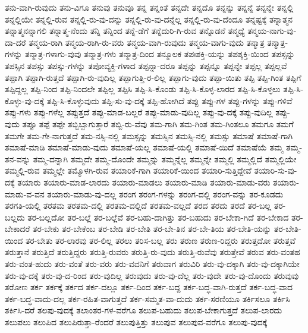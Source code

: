 {ತನು-ವಾಗಿ-ರುವುದು
ತನು-ವಿಗೂ
ತನುವು
ತನುವೂ
ತನ್ನ
ತನ್ನಂತೆ
ತನ್ನದೇ
ತನ್ನದೊ
ತನ್ನನ್ನು
ತನ್ನನ್ನೆ
ತನ್ನನ್ನೇ
ತನ್ನಲ್ಲಿ
ತನ್ನಲ್ಲಿಯೇ
ತನ್ನಲ್ಲಿ-ರುವ
ತನ್ನಲ್ಲಿ-ರು-ವು-ದನ್ನು
ತನ್ನಲ್ಲಿ-ರು-ವು-ದನ್ನೆಲ್ಲ
ತನ್ನಲ್ಲಿ-ರು-ವು-ದೆಂದೂ
ತನ್ನಷ್ಟಕ್ಕೆ
ತನ್ನಾತ್ಮನ
ತನ್ನಾತ್ಮನನ್ನಾಗಲಿ
ತನ್ನಾತ್ಮ-ನೆಂದು
ತನ್ನಿ
ತನ್ನಿಂದ
ತನ್ನೆ-ಡೆಗೆ
ತನ್ನೆದುರಿ-ಗಿ-ರುವ
ತನ್ನೊಡನೆ
ತನ್ಮಧ್ಯೆ
ತನ್ಮಯ-ನಾಗು-ವು-ದಾ-ದರೆ
ತನ್ಮಯ-ರಾಗಿ
ತನ್ಮಯ-ರಾಗಿ-ರು-ವರು
ತನ್ಮಯ-ವಾಗಿ-ರುವುದು
ತನ್ಮಯ-ವಾಗು-ವುದು
ತನ್ಮಾತ್ರ
ತನ್ಮಾತ್ರ-ಗಳನ್ನು
ತನ್ಮಾತ್ರ-ಗಳಾಗು-ವುವು
ತನ್ಮಾತ್ರ-ಗಳು
ತನ್ಮಾತ್ರ-ದಿಂದ
ತನ್ಮೂಲಕ
ತಪಃಶಕ್ತಿ-ಯನ್ನು
ತಪಶ್ಶಕ್ತಿ-ಯಿಂದ
ತಪಸ್ಸನ್ನು
ತಪಸ್ಸಿನ
ತಪಸ್ಸು
ತಪಸ್ಸು-ಗಳನ್ನು
ತಪೋವ್ಯಕ್ತಿ-ಗಳಾದ
ತಪ್ಪನ್ನಾ-ದರೂ
ತಪ್ಪನ್ನು
ತಪ್ಪನ್ನೂ
ತಪ್ಪನ್ನೇ
ತಪ್ಪಲ್ಲ
ತಪ್ಪಲ್ಲವೆ
ತಪ್ಪಾಗಿ
ತಪ್ಪಾಗಿ-ರುತ್ತದೆ
ತಪ್ಪಾಗಿ-ರು-ವುದಿಲ್ಲ
ತಪ್ಪಾಗುತ್ತಿ-ರ-ಲಿಲ್ಲ
ತಪ್ಪಾಗು-ವುದು
ತಪ್ಪಾ-ಯಿತು
ತಪ್ಪಿ
ತಪ್ಪಿ-ಗಿಂತ
ತಪ್ಪಿಗೆ
ತಪ್ಪಿದ್ದಲ್ಲ
ತಪ್ಪಿ-ನಿಂದ
ತಪ್ಪಿ-ನಿಂದಲೇ
ತಪ್ಪಿಲ್ಲ
ತಪ್ಪಿಸಿ
ತಪ್ಪಿ-ಸಿ-ಕೊಂಡು
ತಪ್ಪಿ-ಸಿ-ಕೊಳ್ಳ-ಲಾರದ
ತಪ್ಪಿ-ಸಿ-ಕೊಳ್ಳಲು
ತಪ್ಪಿ-ಸಿ-ಕೊಳ್ಳು-ವು-ದಕ್ಕೆ
ತಪ್ಪಿ-ಸಿ-ಕೊಳ್ಳುವುದು
ತಪ್ಪಿ-ಸು-ವು-ದಕ್ಕೆ
ತಪ್ಪಿ-ಹೋಗಿದೆ
ತಪ್ಪು
ತಪ್ಪು-ಗಳ
ತಪ್ಪು-ಗಳನ್ನು
ತಪ್ಪು-ಗಳಿವೆ
ತಪ್ಪು-ಗಳು
ತಪ್ಪು-ಗಳೆಲ್ಲ
ತಪ್ಪುತ್ತದೆ
ತಪ್ಪು-ಮಾಡ-ಬಲ್ಲರೆ
ತಪ್ಪು-ಮಾಡು-ವುದಿಲ್ಲ
ತಪ್ಪು-ವು-ದಕ್ಕೆ
ತಪ್ಪು-ವುದಿಲ್ಲ
ತಪ್ಪು-ವುದು
ತಪ್ಪೂ
ತಪ್ಪೆ
ತಪ್ಪೇ
ತಬ್ಬಿಬ್ಬಾಗುತ್ತಾರೆ
ತಬ್ಬಿ-ರು-ವೆವು
ತಮ-ಗಾಗಿ
ತಮ-ಗಿಂತ
ತಮ-ಗಿಂತಲೂ
ತಮಗೂ
ತಮಗೆ
ತಮಗೇ
ತಮ-ಗೇ-ನಾಗುತ್ತದೆ
ತಮ-ನಸ್ಸಿ-ನಲ್ಲಿ
ತಮಸ್ಸನ್ನು
ತಮಸ್ಸಿನ
ತಮಸ್ಸಿ-ನಲ್ಲಿ
ತಮಸ್ಸು
ತಮಾಷೆ
ತಮಾಷೆ-ಗಾಗಿ
ತಮಾಷೆ-ಮಾಡಿ
ತಮಾಷೆ-ಮಾಡು-ವುದು
ತಮಾಷೆ-ಯಲ್ಲ
ತಮಾಷೆ-ಯಲ್ಲಿ
ತಮಾಷೆ-ಯಿದೆ
ತಮಾಷೆಯೆ
ತಮ್ಮ
ತಮ್ಮ-ತನ-ವನ್ನು
ತಮ್ಮ-ದನ್ನಾಗಿ
ತಮ್ಮದೇ
ತಮ್ಮ-ದೊಂದೇ
ತಮ್ಮನ್ನು
ತಮ್ಮನ್ನೆಲ್ಲ
ತಮ್ಮನ್ನೇ
ತಮ್ಮಲ್ಲಿ
ತಮ್ಮಲ್ಲಿದೆ
ತಮ್ಮಲ್ಲಿಯೇ
ತಮ್ಮಲ್ಲಿ-ರುವ
ತಮ್ಮಲ್ಲೇ
ತಮ್ಮೊಳಗಿ-ರುವ
ತಯಾರಿಕೆ-ಗಾಗಿ
ತಯಾರಿಕೆ-ಯಿಂದ
ತಯಾರಿ-ಸುತ್ತಿದ್ದೇವೆ
ತಯಾರಿ-ಸು-ವು-ದಕ್ಕೆ
ತಯಾರು
ತಯಾರು-ಮಾಡ-ಲಾರದು
ತಯಾರು-ಮಾಡಲು
ತಯಾರು-ಮಾಡಿ
ತಯಾರು-ಮಾಡು-ವರು
ತಯಾರು-ಮಾಡು-ವ-ವನ
ತಯಾರು-ಮಾಡು-ವು-ದಲ್ಲ
ತರಂಗ
ತರಂಗ-ಗಳನ್ನು
ತರಂಗ-ದಲ್ಲಿ
ತರಂಗ-ವನ್ನು
ತರ-ಕೂಡದು
ತರಗತಿ-ಯಲ್ಲಿ
ತರತಮ
ತರತಮ-ದಲ್ಲಿ
ತರತಮ-ದಲ್ಲಿದೆ
ತರತಮ-ವಲ್ಲದೆ
ತರದ
ತರದು
ತರದೆ
ತರ-ಬಲ್ಲ
ತರ-ಬಲ್ಲದು
ತರ-ಬಲ್ಲದೋ
ತರ-ಬಲ್ಲೆ
ತರ-ಬಲ್ಲೆವೆ
ತರ-ಬಹು-ದಾಗಿತ್ತು
ತರ-ಬಹುದು
ತರ-ಬೇಕಾ-ಗಿದೆ
ತರ-ಬೇಕಾದ
ತರ-ಬೇಕಾದರೆ
ತರ-ಬೇಕು
ತರ-ಬೇಕೆಂಬ
ತರ-ಬೇಡಿ
ತರ-ಬೇತಿ
ತರ-ಬೇ-ತಿನ
ತರ-ಬೇ-ತಿಯ
ತರ-ಬೇತಿ-ಯನ್ನು
ತರ-ಬೇತಿ-ಯಿಂದ
ತರ-ಬೇತು
ತರ-ಲಾರವು
ತರ-ಲಿಲ್ಲ
ತರಲು
ತರಿಸ-ಬಲ್ಲ
ತರು
ತರುಣ
ತರುಣ-ರಿದ್ದರು
ತರುತ್ತದೋ
ತರುತ್ತವೆ
ತರುತ್ತಾನೆ
ತರುತ್ತಿದೆ
ತರುತ್ತಿದ್ದರು
ತರುತ್ತಿ-ರುವರು
ತರುತ್ತಿ-ರು-ವುದು
ತರುತ್ತಿ-ರುವೆವು
ತರುತ್ತೇವೆ
ತರುವ
ತರು-ವಂತಹ
ತರು-ವಂತ-ಹುದು
ತರು-ವಂತೆ
ತರು-ವರು
ತರು-ವವನಿಗೆ
ತರುವಾಗ
ತರುವಿರಿ
ತರು-ವು-ದಕ್ಕಾಗಿ
ತರು-ವು-ದಕ್ಕಾಗಿಯೇ
ತರು-ವು-ದಕ್ಕೆ
ತರು-ವು-ದ-ರಿಂದ
ತರು-ವುದಿಲ್ಲ
ತರುವುದು
ತರು-ವು-ದೆಲ್ಲ
ತರು-ವುದೇ
ತರು-ವು-ದೊಂದು
ತರುವುವು
ತರೋಣ
ತರ್ಕ
ತರ್ಕಕ್ಕೆ
ತರ್ಕದ
ತರ್ಕ-ದಲ್ಲೂ
ತರ್ಕ-ದಿಂದ
ತರ್ಕ-ಬದ್ದ
ತರ್ಕ-ಬದ್ಧ-ವಾಗಿ-ರುತ್ತದೆ
ತರ್ಕ-ಬದ್ಧ-ವಾದ
ತರ್ಕ-ಬದ್ಧ-ವಾದು-ದಲ್ಲ
ತರ್ಕ-ರಹಿತ-ವಾಗುತ್ತದೆ
ತರ್ಕ-ಸಮ್ಮತ-ವಾ-ದುದು
ತರ್ಕ-ಸರಣಿಯೂ
ತರ್ಕಿಸಲೂ
ತರ್ಕಿಸಿ
ತರ್ಕಿಸಿ-ದರೆ
ತಲಪು-ವುದಕ್ಕೆ
ತಲಾಂತರ-ಗಳ-ವರೆಗೂ
ತಲುಪ-ಬಹುದು
ತಲುಪ-ಬೇಕಾಗುತ್ತದೆ
ತಲುಪ-ಲಾರದು
ತಲುಪಲು
ತಲುಪಿದ
ತಲುಪಿರುತ್ತಾ-ರೆಂದರೆ
ತಲುಪುತ್ತಿತ್ತು
ತಲುಪುವ
ತಲುಪುವ-ವರೆಗೂ
ತಲುಪು-ವುದಕ್ಕೆ
}
